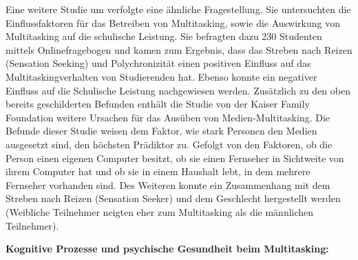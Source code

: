 Eine weitere Studie um  verfolgte eine ähnliche Fragestellung. Sie untersuchten die Einflussfaktoren für das Betreiben von Multitasking, sowie die Auswirkung von Multitasking auf die schulische Leistung. Sie befragten dazu 230 Studenten mittels Onlinefragebogen und kamen zum Ergebnis, dass das Streben nach Reizen (Sensation Seeking) und Polychronizität einen positiven Einfluss auf das Multitaskingverhalten von Studierenden hat. Ebenso konnte ein negativer Einfluss auf die Schulische Leistung nachgewiesen werden. Zusätzlich zu den oben bereits geschilderten Befunden enthält die Studie von  der Kaiser Family Foundation weitere Ursachen für das Ausüben von Medien-Multitasking. Die Befunde dieser Studie weisen dem Faktor, wie stark Personen den Medien ausgesetzt sind, den höchsten Prädiktor zu. Gefolgt von den Faktoren, ob die Person einen eigenen Computer besitzt, ob sie einen Fernseher in Sichtweite von ihrem Computer hat und ob sie in einem Haushalt lebt, in dem mehrere Fernseher vorhanden sind. Des Weiteren konnte ein Zusammenhang mit dem Streben nach Reizen (Sensation Seeker) und dem Geschlecht hergestellt werden (Weibliche Teilnehmer neigten eher zum Multitasking als die männlichen Teilnehmer).
\par
\textbf{Kognitive Prozesse und psychische Gesundheit beim Multitasking:} 
